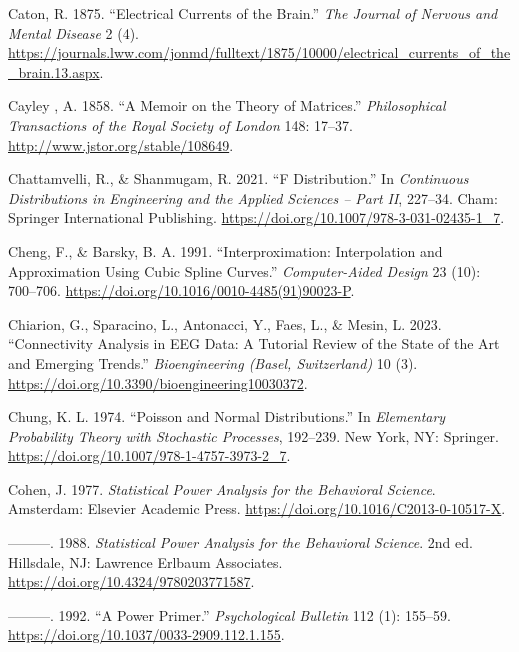 \documentclass[
]{article}
\newlength{\cslhangindent}
\newlength{\cslentryspacingunit} %
\newenvironment{CSLReferences}[2] %
 {%
  \setlength{\parindent}{0pt}
  \ifodd #1
  \let\oldpar\par
  \def\par{\hangindent=\cslhangindent\oldpar}
  \fi
  \setlength{\parskip}{#2\cslentryspacingunit}
 }%
 {}
\begin{document}
\begin{CSLReferences}{1}{0}
\leavevmode{}%
Caton, R. 1875. {``Electrical Currents of the Brain.''} \emph{The
Journal of Nervous and Mental Disease} 2 (4).
\url{https://journals.lww.com/jonmd/fulltext/1875/10000/electrical_currents_of_the_brain.13.aspx}.

\leavevmode{}%
Cayley , A. 1858. {``A Memoir on the Theory of Matrices.''}
\emph{Philosophical Transactions of the Royal Society of London} 148:
17--37. \url{http://www.jstor.org/stable/108649}.

\leavevmode{}%
Chattamvelli, R., \& Shanmugam, R. 2021. {``{F Distribution}.''} In
\emph{Continuous Distributions in Engineering and the Applied Sciences
-- Part II}, 227--34. Cham: Springer International Publishing.
\url{https://doi.org/10.1007/978-3-031-02435-1_7}.

\leavevmode{}%
Cheng, F., \& Barsky, B. A. 1991. {``Interproximation: Interpolation and
Approximation Using Cubic Spline Curves.''} \emph{Computer-Aided Design}
23 (10): 700--706. \url{https://doi.org/10.1016/0010-4485(91)90023-P}.

\leavevmode{}%
Chiarion, G., Sparacino, L., Antonacci, Y., Faes, L., \& Mesin, L. 2023.
{``Connectivity Analysis in EEG Data: A Tutorial Review of the State of
the Art and Emerging Trends.''} \emph{Bioengineering (Basel,
Switzerland)} 10 (3).
\url{https://doi.org/10.3390/bioengineering10030372}.

\leavevmode{}%
Chung, K. L. 1974. {``Poisson and Normal Distributions.''} In
\emph{Elementary Probability Theory with Stochastic Processes},
192--239. New York, NY: Springer.
\url{https://doi.org/10.1007/978-1-4757-3973-2_7}.

\leavevmode{}%
Cohen, J. 1977. \emph{Statistical Power Analysis for the Behavioral
Science}. Amsterdam: Elsevier Academic Press.
\url{https://doi.org/10.1016/C2013-0-10517-X}.

\leavevmode{}%
---------. 1988. \emph{Statistical Power Analysis for the Behavioral
Science}. 2nd ed. Hillsdale, NJ: Lawrence Erlbaum Associates.
\url{https://doi.org/10.4324/9780203771587}.

\leavevmode{}%
---------. 1992. {``A Power Primer.''} \emph{Psychological Bulletin} 112
(1): 155--59. \url{https://doi.org/10.1037/0033-2909.112.1.155}.


\end{CSLReferences}
\end{document}
